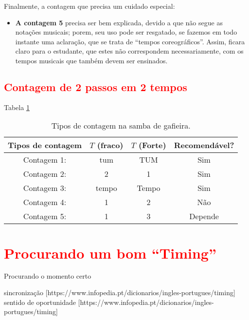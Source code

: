 Finalmente, a contagem que precisa um cuidado especial:
\begin{itemize}

\item \textbf{A contagem 5} precisa ser bem explicada, 
devido a que não segue as notações musicais; porem, seu uso pode ser resgatado,
se fazemos em todo instante uma aclaração, que se trata de ``tempos coreográficos''.
Assim, ficara claro para o estudante, que estes não correspondem necessariamente, 
com os tempos musicais que também devem ser ensinados.

\end{itemize}

\subsection{\textcolor{red}{Contagem de 2 passos em 2 tempos}}


Tabela \ref{tab:ritmoconta2}

\begin{table}[ht]
  \centering
  \begin{tabular}    {c|cc|c}
    \hline
    Tipos de contagem       & $T$ (fraco)  & $T$ (Forte)& Recomendável?\\
    \hline
    Contagem 1: & tum  & TUM  & Sim\\
    Contagem 2: & 2     & 1     & Sim\\
    Contagem 3: & tempo & Tempo & Sim\\ \hline
    Contagem 4: & 1     & 2     & Não\\ \hline
    Contagem 5: & 1     & 3     & Depende\\  \hline
    \hline
  \end{tabular}
  \caption{Tipos de contagem na samba de gafieira.}
\label{tab:ritmoconta2}
\end{table}

\section{\textcolor{red}{Procurando um bom ``Timing''}}
Procurando o momento certo

 sincronização [https://www.infopedia.pt/dicionarios/ingles-portugues/timing]
 sentido de oportunidade [https://www.infopedia.pt/dicionarios/ingles-portugues/timing]
